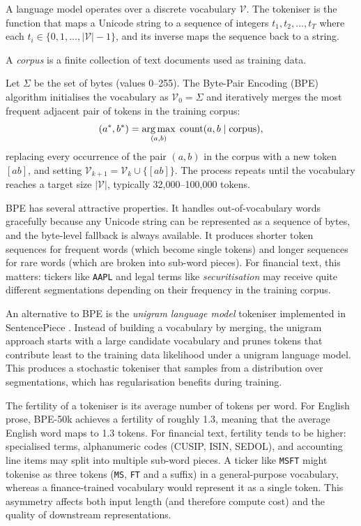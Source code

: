 \begin{context}
A language model operates over a discrete vocabulary $\mathcal{V}$.  The
tokeniser is the function that maps a Unicode string to a sequence of integers
$t_1, t_2, \ldots, t_T$ where each $t_i \in \{0, 1, \ldots, |\mathcal{V}|-1\}$,
and its inverse maps the sequence back to a string.

A \emph{corpus} is a finite collection of text documents used as training data.

\begin{definition}
\label{def:bpe}
Let $\Sigma$ be the set of bytes (values 0--255).  The Byte-Pair Encoding (BPE)
algorithm \cite{sennrich2016bpe} initialises the vocabulary as $\mathcal{V}_0 = \Sigma$
and iteratively merges the most frequent adjacent pair of tokens in the training
corpus:
\begin{equation}
  (a^*, b^*) = \operatorname*{arg\,max}_{(a, b)} \; \text{count}(a, b \mid \text{corpus}),
  \label{eq:bpe-merge}
\end{equation}
replacing every occurrence of the pair $(a, b)$ in the corpus with a new token
$[ab]$, and setting $\mathcal{V}_{k+1} = \mathcal{V}_k \cup \{[ab]\}$.
The process repeats until the vocabulary reaches a target size $|\mathcal{V}|$,
typically 32{,}000--100{,}000 tokens.
\end{definition}

BPE has several attractive properties.  It handles out-of-vocabulary words
gracefully because any Unicode string can be represented as a sequence of bytes,
and the byte-level fallback is always available.  It produces shorter token
sequences for frequent words (which become single tokens) and longer sequences
for rare words (which are broken into sub-word pieces).  For financial text,
this matters: tickers like \texttt{AAPL} and legal terms like
\textit{securitisation} may receive quite different segmentations depending on
their frequency in the training corpus.

An alternative to BPE is the \emph{unigram language model} tokeniser
implemented in SentencePiece \cite{kudo2018sentencepiece}.  Instead of
building a vocabulary by merging, the unigram approach starts with a large
candidate vocabulary and prunes tokens that contribute least to the training
data likelihood under a unigram language model.  This produces a stochastic
tokeniser that samples from a distribution over segmentations, which has
regularisation benefits during training.

The fertility of a tokeniser is its average number of tokens per word.
For English prose, BPE-50k achieves a fertility of roughly 1.3, meaning
that the average English word maps to 1.3 tokens.  For financial text,
fertility tends to be higher: specialised terms, alphanumeric codes (CUSIP,
ISIN, SEDOL), and accounting line items may split into multiple sub-word
pieces.  A ticker like \texttt{MSFT} might tokenise as three tokens
(\texttt{MS}, \texttt{FT} and a suffix) in a general-purpose vocabulary,
whereas a finance-trained vocabulary would represent it as a single token.
This asymmetry affects both input length (and therefore compute cost) and the
quality of downstream representations.


\end{context}
